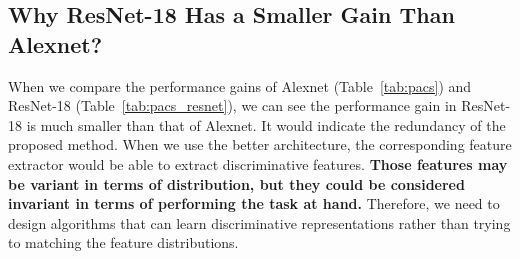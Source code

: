 \subsection{Why ResNet-18 Has a Smaller Gain Than Alexnet?}\label{resnet_discussion}
When we compare the performance gains of Alexnet (Table~\ref{tab:pacs}) and ResNet-18 (Table~\ref{tab:pacs_resnet}), we can see the performance gain in ResNet-18 is much smaller than that of Alexnet. It would indicate the redundancy of the proposed method. When we use the better architecture, the corresponding feature extractor would be able to extract discriminative features. \textbf{Those features may be variant in terms of distribution, but they could be considered invariant in terms of performing the task at hand.} Therefore, we need to design algorithms that can learn discriminative representations rather than trying to matching the feature distributions.

